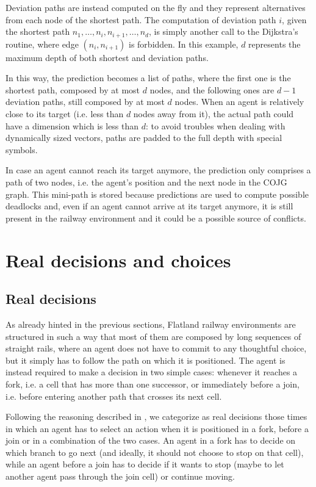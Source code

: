 \documentclass[a4paper,10pt]{report}
\begin{document}
Deviation paths are instead computed on the fly and they represent alternatives from each node of the shortest path. The computation of deviation path $i$, given the shortest path $n_1, \dots, n_i, n_{i+1}, \dots, n_d$, is simply another call to the Dijkstra's routine, where edge $(n_i, n_{i+1})$ is forbidden. In this example, $d$ represents the maximum depth of both shortest and deviation paths.

In this way, the prediction becomes a list of paths, where the first one is the shortest path, composed by at most $d$ nodes, and the following ones are $d-1$ deviation paths, still composed by at most $d$ nodes. When an agent is relatively close to its target (i.e. less than $d$ nodes away from it), the actual path could have a dimension which is less than $d$: to avoid troubles when dealing with dynamically sized vectors, paths are padded to the full depth with special symbols.

In case an agent cannot reach its target anymore, the prediction only comprises a path of two nodes, i.e. the agent's position and the next node in the COJG graph. This mini-path is stored because predictions are used to compute possible deadlocks and, even if an agent cannot arrive at its target anymore, it is still present in the railway environment and it could be a possible source of conflicts.

\section{Real decisions and choices}\label{sec:real-decisions-choices}

\subsection{Real decisions}\label{subsec:real-decisions}
As already hinted in the previous sections, Flatland railway environments are structured in such a way that most of them are composed by long sequences of straight rails, where an agent does not have to commit to any thoughtful choice, but it simply has to follow the path on which it is positioned. The agent is instead required to make a decision in two simple cases: whenever it reaches a fork, i.e. a cell that has more than one successor, or immediately before a join, i.e. before entering another path that crosses its next cell.

Following the reasoning described in \cite{jonas}, we categorize as real decisions those times in which an agent has to select an action when it is positioned in a fork, before a join or in a combination of the two cases. An agent in a fork has to decide on which branch to go next (and ideally, it should not choose to stop on that cell), while an agent before a join has to decide if it wants to stop (maybe to let another agent pass through the join cell) or continue moving.
\end{document}
